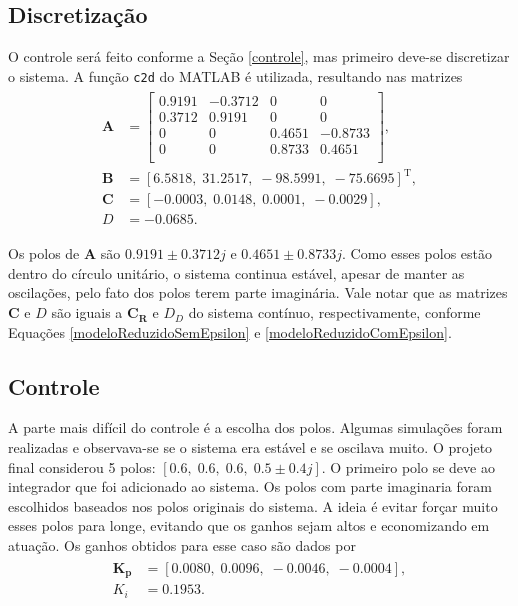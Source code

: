 \subsection{Discretização}
 O controle será feito conforme a Seção \ref{controle}, mas primeiro deve-se discretizar o sistema. A função \texttt{c2d} \cite{c2d} do MATLAB é utilizada, resultando nas matrizes \begin{align}
 \begin{array}{ll}
 	\mathbf{A} &= \left[\begin{array}{cccc}
	0.9191&   -0.3712&         0&         0\\
    0.3712&    0.9191&         0&         0\\
         0&         0&    0.4651&   -0.8733\\
         0&         0&    0.8733&    0.4651\\
 \end{array}\right],\\
 	\mathbf{B} &= \left[6.5818,\;
   31.2517,\;
  -98.5991,\;
  -75.6695\right]^{\mathrm{T}},\\
   \mathbf{C} &= \left[-0.0003,\;0.0148,\;0.0001,\;-0.0029\right],\\
   D &= -0.0685.
 \end{array}
 \end{align}
 
 Os polos de $\mathbf{A}$ são $0.9191 \pm 0.3712j$ e $
   0.4651 \pm 0.8733j$. Como esses polos estão dentro do círculo unitário, o sistema continua estável, apesar de manter as oscilações, pelo fato dos polos terem parte imaginária. Vale notar que as matrizes $\mathbf{C}$ e $D$ são iguais a $\mathbf{C_R}$ e $D_D$ do sistema contínuo, respectivamente, conforme Equações \ref{modeloReduzidoSemEpsilon} e \ref{modeloReduzidoComEpsilon}.
 
\subsection{Controle}

 A parte mais difícil do controle é a escolha dos polos. Algumas simulações foram realizadas e observava-se se o sistema era estável e se oscilava muito. O projeto final considerou 5 polos: $\left[0.6,\;0.6,\;0.6,\;0.5\pm 0.4j\right]$. O primeiro polo se deve ao integrador que foi adicionado ao sistema. Os polos com parte imaginaria foram escolhidos baseados nos polos originais do sistema. A ideia é evitar forçar muito esses polos para longe, evitando que os ganhos sejam altos e economizando em atuação. Os ganhos obtidos para esse caso são dados por \begin{align}
 \begin{array}{ll}
	 	\mathbf{K_p} &= \left[0.0080,\;0.0096,\;-0.0046,\;-0.0004\right],\\
 	K_i &= 0.1953.\\ 	
 \end{array}\label{ganhosObtidos}
 \end{align}
 
